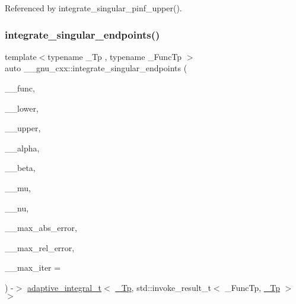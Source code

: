 Referenced by integrate\+\_\+singular\+\_\+pinf\+\_\+upper().

\mbox{\label{namespace____gnu__cxx_acac4890eaca9950b39a06e980f846868}} 
\subsubsection{\texorpdfstring{integrate\+\_\+singular\+\_\+endpoints()}{integrate\_singular\_endpoints()}}
{\footnotesize\ttfamily template$<$typename \+\_\+\+Tp , typename \+\_\+\+Func\+Tp $>$ \\
auto \+\_\+\+\_\+gnu\+\_\+cxx\+::integrate\+\_\+singular\+\_\+endpoints (\begin{DoxyParamCaption}\item[{\+\_\+\+Func\+Tp}]{\+\_\+\+\_\+func,  }\item[{\hyperlink{namespace____gnu__cxx_a3b19a9c800ca194374ef9172290f7d79}{\+\_\+\+Tp}}]{\+\_\+\+\_\+lower,  }\item[{\hyperlink{namespace____gnu__cxx_a3b19a9c800ca194374ef9172290f7d79}{\+\_\+\+Tp}}]{\+\_\+\+\_\+upper,  }\item[{\hyperlink{namespace____gnu__cxx_a3b19a9c800ca194374ef9172290f7d79}{\+\_\+\+Tp}}]{\+\_\+\+\_\+alpha,  }\item[{\hyperlink{namespace____gnu__cxx_a3b19a9c800ca194374ef9172290f7d79}{\+\_\+\+Tp}}]{\+\_\+\+\_\+beta,  }\item[{int}]{\+\_\+\+\_\+mu,  }\item[{int}]{\+\_\+\+\_\+nu,  }\item[{\hyperlink{namespace____gnu__cxx_a3b19a9c800ca194374ef9172290f7d79}{\+\_\+\+Tp}}]{\+\_\+\+\_\+max\+\_\+abs\+\_\+error,  }\item[{\hyperlink{namespace____gnu__cxx_a3b19a9c800ca194374ef9172290f7d79}{\+\_\+\+Tp}}]{\+\_\+\+\_\+max\+\_\+rel\+\_\+error,  }\item[{std\+::size\+\_\+t}]{\+\_\+\+\_\+max\+\_\+iter = {} }\end{DoxyParamCaption}) -\/$>$  \hyperlink{struct____gnu__cxx_1_1adaptive__integral__t}{adaptive\+\_\+integral\+\_\+t}$<$ \hyperlink{namespace____gnu__cxx_a3b19a9c800ca194374ef9172290f7d79}{\+\_\+\+Tp}, std\+::invoke\+\_\+result\+\_\+t$<$ \+\_\+\+Func\+Tp, \hyperlink{namespace____gnu__cxx_a3b19a9c800ca194374ef9172290f7d79}{\+\_\+\+Tp} $>$$>$}

